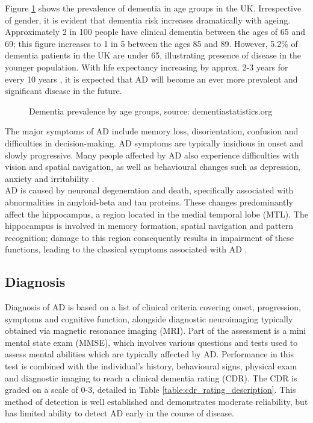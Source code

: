 \documentclass[
    author={Kai Hulme},
    supervisor={Dr Jon Bird},
    degree={BSc},
    title={Generative Adversarial Networks as an Augmentation Technique},
    subtitle={for Alzheimer's Disease Detection in MRI Volumes},
    type={Research},
    year={2021} 
]{dissertation}
\begin{document}
Figure \ref{dementia_prevealence} shows the prevalence of dementia in age groups in the UK. Irrespective of gender, it is evident that dementia risk increases dramatically with ageing. Approximately 2 in 100 people have clinical dementia between the ages of 65 and 69; this figure increases to 1 in 5 between the ages 85 and 89. However, 5.2\% of dementia patients in the UK are under 65, illustrating presence of disease in the younger population. With life expectancy increasing by approx. 2-3 years for every 10 years \cite{person_2015}, it is expected that AD will become an ever more prevalent and significant disease in the future.
\\

\begin{figure}[t]
\centering
{}
\caption{Dementia prevalence by age groups, source: dementiastatistics.org} 
\label{dementia_prevealence}
\end{figure}

The major symptoms of AD include memory loss, disorientation, confusion and difficulties in decision-making. AD symptoms are typically insidious in onset and slowly progressive. Many people affected by AD also experience difficulties with vision and spatial navigation, as well as behavioural changes such as depression, anxiety and irritability \cite{prince2014dementia} .
\\

AD is caused by neuronal degeneration and death, specifically associated with abnormalities in amyloid-beta and tau proteins. These changes predominantly affect the hippocampus, a region located in the medial temporal lobe (MTL). The hippocampus is involved in memory formation, spatial navigation and pattern recognition; damage to this region consequently results in impairment of these functions, leading to the classical symptoms associated with AD \cite{weller2018current} . 

\subsection{Diagnosis}

Diagnosis of AD is based on a list of clinical criteria covering onset, progression, symptoms and cognitive function, alongside diagnostic neuroimaging typically obtained via magnetic resonance imaging (MRI). Part of the assessment is a mini mental state exam (MMSE), which involves various questions and tests used to assess mental abilities which are typically affected by AD. Performance in this test is combined with the individual's history, behavioural signs, physical exam and diagnostic imaging to reach a clinical dementia rating (CDR). The CDR is graded on a scale of 0-3, detailed in Table \ref{table:cdr_rating_description}. This method of detection is well established and  demonstrates moderate reliability, but has limited ability to detect AD early in the course of disease.
\end{document}
